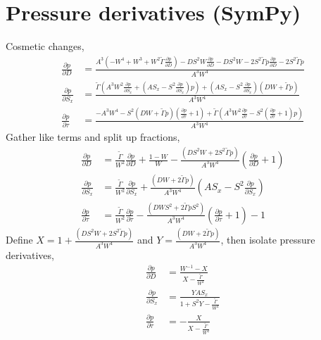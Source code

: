 \documentclass{article}
\begin{document}
\section{Pressure derivatives (SymPy)}
Cosmetic changes,
\begin{align*}
  \frac{\partial p}{\partial D} &= \frac{A^{3} \left(- W^{4} + W^{3} + W^{2} \widetilde{\Gamma} \frac{\partial p}{\partial D}\right) - D S^{2} W \frac{\partial p}{\partial D} - D S^{2} W - 2 S^{2} \widetilde{\Gamma} p \frac{\partial p}{\partial D} - 2 S^{2} \widetilde{\Gamma} p}{A^{3} W^{4}} \\
  \frac{\partial p}{\partial S_x} &= \frac{\widetilde{\Gamma} \left(A^{3} W^{2} \frac{\partial p}{\partial S_{x}} + \left(A S_{x} - S^{2} \frac{\partial p}{\partial S_{x}}\right) p\right) + \left(A S_{x} - S^{2} \frac{\partial p}{\partial S_{x}}\right) \left(D W + \widetilde{\Gamma} p\right)}{A^{3} W^{4}} \\
  \frac{\partial p}{\partial \tau} &= \frac{- A^{3} W^{4} - S^{2} \left(D W + \widetilde{\Gamma} p\right) \left(\frac{\partial p}{\partial \tau} + 1\right) + \widetilde{\Gamma} \left(A^{3} W^{2} \frac{\partial p}{\partial \tau} - S^{2} \left(\frac{\partial p}{\partial \tau} + 1\right) p\right)}{A^{3} W^{4}}
\end{align*}
Gather like terms and split up fractions,
\begin{align*}
  \frac{\partial p}{\partial D} &= \frac{\widetilde{\Gamma}}{W^2} \frac{\partial p}{\partial D} + \frac{1 - W}{W} - \frac{\left(D S^{2} W  + 2 S^{2} \widetilde{\Gamma} p\right)}{A^{3} W^{4}}\left(\frac{\partial p}{\partial D} + 1\right) \\
  \frac{\partial p}{\partial S_x} &= \frac{\widetilde{\Gamma}}{W^2}\frac{\partial p}{\partial S_{x}} + \frac{\left(D W + 2 \widetilde{\Gamma} p\right)}{A^{3} W^{4}}\left(A S_{x} - S^{2} \frac{\partial p}{\partial S_{x}}\right) \\
  \frac{\partial p}{\partial \tau} &= \frac{\widetilde{\Gamma}}{W^2}\frac{\partial p}{\partial \tau} - \frac{\left(D W S^2 + 2\widetilde{\Gamma} p S^2\right)}{A^{3} W^{4}}\left(\frac{\partial p}{\partial \tau} + 1\right) - 1
\end{align*}
Define $X = 1 + \frac{\left(D S^{2} W  + 2 S^{2} \widetilde{\Gamma} p\right)}{A^{3} W^{4}}$ and $Y = \frac{\left(D W + 2 \widetilde{\Gamma} p\right)}{A^{3} W^{4}}$, then isolate pressure derivatives,
\begin{align*}
  \frac{\partial p}{\partial D} &= \frac{W^{-1} - X}{X - \frac{\widetilde{\Gamma}}{W^2}} \\
  \frac{\partial p}{\partial S_x} &= \frac{Y A S_{x}}{1 + S^2 Y - \frac{\widetilde{\Gamma}}{W^2}} \\
  \frac{\partial p}{\partial \tau} &= -\frac{X}{X - \frac{\widetilde{\Gamma}}{W^2}}
\end{align*}
\end{document}
